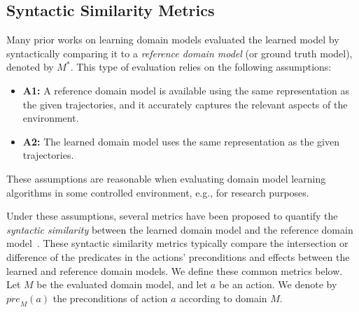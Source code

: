 \documentclass[letterpaper]{article} %
\newcommand{\pre}{\ensuremath{\textit{pre}}\xspace}
\newcommand{\realm}{{\ensuremath{M^*}}\xspace}
\newif\ifaddcomments
\newcommand{\roni}[1]{\ifaddcomments{\textcolor{red}{[Roni: #1]}}\fi}
\newcommand{\cm}[1]{\ifaddcomments{\textcolor{olive}{[Christian: #1]}}\fi}
\begin{document}
\subsection{Syntactic Similarity Metrics}
Many prior works on learning domain models evaluated the learned model by syntactically comparing it to a \emph{reference domain model} (or ground truth model), denoted by $\realm$. This type of evaluation relies on the following assumptions:
\begin{itemize}
    \item \textbf{A1:} A reference domain model 
    is available using the same representation as the given trajectories, and it accurately captures the relevant aspects of the environment. 
    \item \textbf{A2:} The learned domain model uses the same representation as the given trajectories. 
\end{itemize}
These assumptions are reasonable when evaluating domain model learning algorithms in some controlled environment, e.g., for research purposes. 



Under these assumptions, several metrics have been proposed to quantify the \emph{syntactic similarity} between the learned domain model and the reference domain model~\citep{aineto2019learning,mordoch2023safe,xi2024neuro,Oswald2024DLLMDomainModeling}.
These syntactic similarity metrics typically compare the intersection or difference of the predicates in the actions' preconditions and effects between the learned and reference domain models. We define these common metrics below. 
Let $M$ be the evaluated domain model, and let $a$ be an action. We denote by $\pre_M(a)$ the preconditions of action $a$ according to domain $M$.

\end{document}
